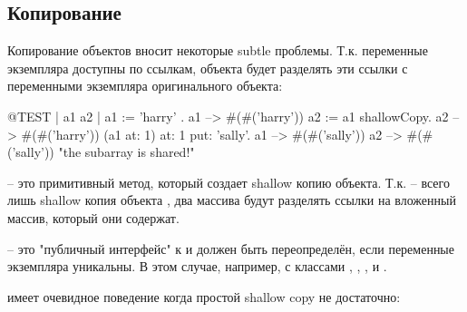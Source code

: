 \documentclass[a4paper,10pt,twoside]{book}
\begin{document}
\subsection{Копирование}

Копирование объектов вносит некоторые subtle проблемы. Т.к. переменные экземпляра доступны по ссылкам,  объекта будет разделять эти ссылки с переменными экземпляра оригинального объекта:


\begin{code}{@TEST | a1 a2 |}
a1 := { { 'harry' } }.
a1 --> #(#('harry'))
a2 := a1 shallowCopy.
a2 --> #(#('harry'))
(a1 at: 1) at: 1 put: 'sally'.
a1 --> #(#('sally'))
a2 --> #(#('sally'))    "the subarray is shared!"
\end{code}

 -- это примитивный метод, который создает shallow копию объекта. Т.к.  -- всего лишь shallow копия объекта , два массива будут разделять ссылки на вложенный массив, который они содержат.

 -- это "публичный интерфейс" к  и должен быть переопределён, если переменные экземпляра уникальны. В этом случае, например, с классами , , ,  и .

 имеет очевидное поведение когда простой shallow copy не достаточно:
\end{document}
